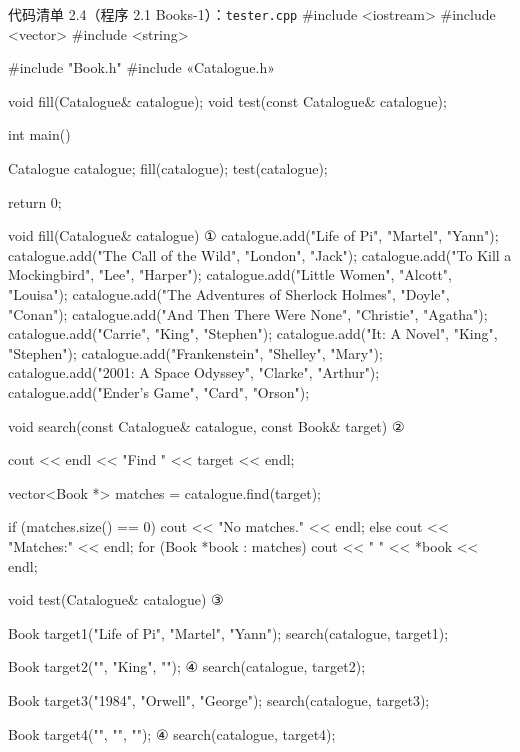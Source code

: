 \begin{codeboxt}{代码清单 2.4（程序 2.1 Books-1）：\texttt{tester.\allowbreak{}cpp}}
#include <iostream>
#include <vector>
#include <string>

#include "Book.h"
#include «Catalogue.h»

void fill(Catalogue& catalogue);
void test(const Catalogue& catalogue);

int main()
{
    Catalogue catalogue;
    fill(catalogue);
    test(catalogue);

    return 0;
}

void fill(Catalogue& catalogue)                              ①
{
    catalogue.add("Life of Pi", "Martel", "Yann");
    catalogue.add("The Call of the Wild", "London", "Jack");
    catalogue.add("To Kill a Mockingbird", "Lee", "Harper");
    catalogue.add("Little Women", "Alcott", "Louisa");
    catalogue.add("The Adventures of Sherlock Holmes", 
                  "Doyle", "Conan");
    catalogue.add("And Then There Were None", "Christie", "Agatha");
    catalogue.add("Carrie", "King", "Stephen");
    catalogue.add("It: A Novel", "King", "Stephen");
    catalogue.add("Frankenstein", "Shelley", "Mary");
    catalogue.add("2001: A Space Odyssey", "Clarke", "Arthur");
    catalogue.add("Ender's Game", "Card", "Orson");
}

void search(const Catalogue& catalogue, const Book& target)   ②
{
    cout << endl << "Find " << target << endl;

    vector<Book *> matches = catalogue.find(target);

    if (matches.size() == 0) cout << "No matches." << endl;
    else
    {
        cout << "Matches:" << endl;
        for (Book *book : matches)
        {
            cout << "  " << *book << endl;
        }
    }
}

void test(Catalogue& catalogue)                               ③
{
    Book target1("Life of Pi", "Martel", "Yann");
    search(catalogue, target1);

    Book target2("", "King", "");                             ④
    search(catalogue, target2);

    Book target3("1984", "Orwell", "George");
    search(catalogue, target3);

    Book target4("", "", "");                                 ④
    search(catalogue, target4);
}
\end{codeboxt}
\par
{}\par
{}\par
{}\par

